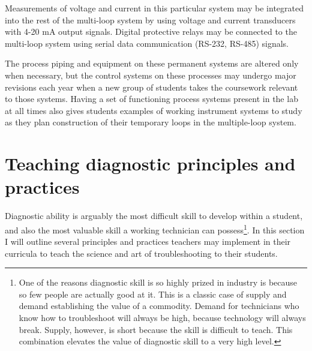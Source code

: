 Measurements of voltage and current in this particular system may be integrated into the rest of the multi-loop system by using voltage and current transducers with 4-20 mA output signals.  Digital protective relays may be connected to the multi-loop system using serial data communication (RS-232, RS-485) signals.

\vskip 10pt

The process piping and equipment on these permanent systems are altered only when necessary, but the control systems on these processes may undergo major revisions each year when a new group of students takes the coursework relevant to those systems.  Having a set of functioning process systems present in the lab at all times also gives students examples of working instrument systems to study as they plan construction of their temporary loops in the multiple-loop system.








\filbreak
\section{Teaching diagnostic principles and practices}

Diagnostic ability is arguably the most difficult skill to develop within a student, and also the most valuable skill a working technician can possess\footnote{One of the reasons diagnostic skill is so highly prized in industry is because so few people are actually good at it.  This is a classic case of supply and demand establishing the value of a commodity.  Demand for technicians who know how to troubleshoot will always be high, because technology will always break.  Supply, however, is short because the skill is difficult to teach.  This combination elevates the value of diagnostic skill to a very high level.}.  In this section I will outline several principles and practices teachers may implement in their curricula to teach the science and art of troubleshooting to their students.

